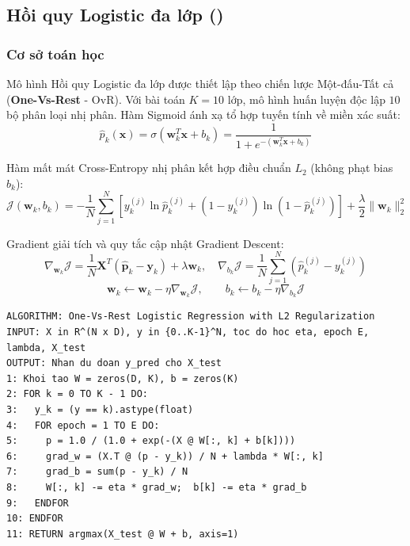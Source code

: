 \subsection{Hồi quy Logistic đa lớp ()}
\subsubsection{Cơ sở toán học}
Mô hình Hồi quy Logistic đa lớp được thiết lập theo chiến lược Một-đấu-Tất cả (\textbf{One-Vs-Rest} - OvR). Với bài toán $K = 10$ lớp, mô hình huấn luyện độc lập $10$ bộ phân loại nhị phân. Hàm Sigmoid ánh xạ tổ hợp tuyến tính về miền xác suất:
\begin{equation}
    \hat{p}_k(\mathbf{x}) = \sigma(\mathbf{w}_k^T \mathbf{x} + b_k) = \frac{1}{1 + e^{-(\mathbf{w}_k^T \mathbf{x} + b_k)}}
\end{equation}

Hàm mất mát Cross-Entropy nhị phân kết hợp điều chuẩn $L_2$ (không phạt bias $b_k$):
\begin{equation}
    \mathcal{J}(\mathbf{w}_k, b_k) = -\frac{1}{N} \sum_{j=1}^N \left[ y_k^{(j)} \ln \hat{p}_k^{(j)} + (1 - y_k^{(j)}) \ln (1 - \hat{p}_k^{(j)}) \right] + \frac{\lambda}{2} \|\mathbf{w}_k\|_2^2
\end{equation}

Gradient giải tích và quy tắc cập nhật Gradient Descent:
\begin{equation}
    \nabla_{\mathbf{w}_k} \mathcal{J} = \frac{1}{N} \mathbf{X}^T (\hat{\mathbf{p}}_k - \mathbf{y}_k) + \lambda \mathbf{w}_k, \quad \nabla_{b_k} \mathcal{J} = \frac{1}{N} \sum_{j=1}^N (\hat{p}_k^{(j)} - y_k^{(j)})
\end{equation}
\begin{equation}
    \mathbf{w}_k \leftarrow \mathbf{w}_k - \eta \nabla_{\mathbf{w}_k} \mathcal{J}, \qquad b_k \leftarrow b_k - \eta \nabla_{b_k} \mathcal{J}
\end{equation}

\begin{lstlisting}[style=pseudocode, caption={Thuật toán One-Vs-Rest Logistic Regression}]
ALGORITHM: One-Vs-Rest Logistic Regression with L2 Regularization
INPUT: X in R^(N x D), y in {0..K-1}^N, toc do hoc eta, epoch E, lambda, X_test
OUTPUT: Nhan du doan y_pred cho X_test
1: Khoi tao W = zeros(D, K), b = zeros(K)
2: FOR k = 0 TO K - 1 DO:
3:   y_k = (y == k).astype(float)
4:   FOR epoch = 1 TO E DO:
5:     p = 1.0 / (1.0 + exp(-(X @ W[:, k] + b[k])))
6:     grad_w = (X.T @ (p - y_k)) / N + lambda * W[:, k]
7:     grad_b = sum(p - y_k) / N
8:     W[:, k] -= eta * grad_w;  b[k] -= eta * grad_b
9:   ENDFOR
10: ENDFOR
11: RETURN argmax(X_test @ W + b, axis=1)
\end{lstlisting}

